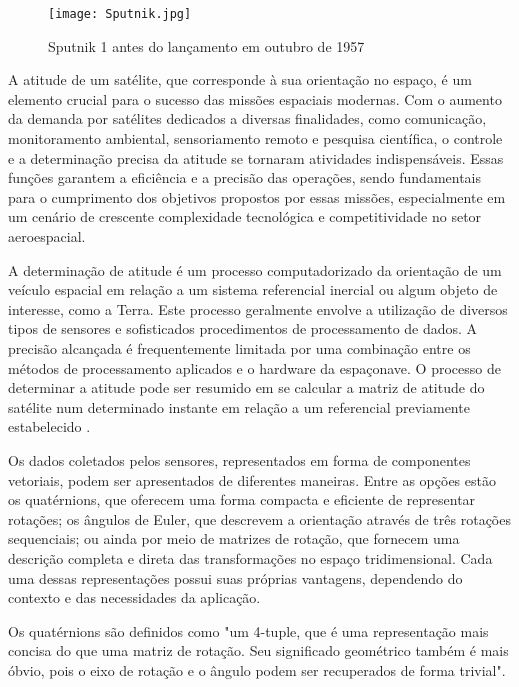 \documentclass[
	12pt,				%
	openright,			%
	oneside,			%
	a4paper,			%
	english,			%
	brazil				%
	]{abntex2}
\begin{document}
\begin{figure}[h]
	\centering
	\texttt{[image: Sputnik.jpg]} %
	\caption[Sputnik 1 antes do lançamento em outubro de 1957]{Sputnik 1 antes do lançamento em outubro de 1957}
	\label{fig:sputnik}
\end{figure}

A atitude de um satélite, que corresponde à sua orientação no espaço, é um elemento crucial para o sucesso das missões espaciais modernas. Com o aumento da demanda por satélites dedicados a diversas finalidades, como comunicação, monitoramento ambiental, sensoriamento remoto e pesquisa científica, o controle e a determinação precisa da atitude se tornaram atividades indispensáveis. Essas funções garantem a eficiência e a precisão das operações, sendo fundamentais para o cumprimento dos objetivos propostos por essas missões, especialmente em um cenário de crescente complexidade tecnológica e competitividade no setor aeroespacial.

A determinação de atitude é um processo computadorizado da orientação de um veículo espacial em relação a um sistema referencial inercial ou algum objeto de interesse, como a Terra. Este processo geralmente envolve a utilização de diversos tipos de sensores e sofisticados procedimentos de processamento de dados. A precisão alcançada é frequentemente limitada por uma combinação entre os métodos de processamento aplicados e o hardware da espaçonave. O processo de determinar a atitude pode ser resumido em se calcular a matriz de atitude do satélite num determinado instante em relação a um referencial previamente estabelecido \cite{Wertz2012}.

Os dados coletados pelos sensores, representados em forma de componentes vetoriais, podem ser apresentados de diferentes maneiras. Entre as opções estão os quatérnions, que oferecem uma forma compacta e eficiente de representar rotações; os ângulos de Euler, que descrevem a orientação através de três rotações sequenciais; ou ainda por meio de matrizes de rotação, que fornecem uma descrição completa e direta das transformações no espaço tridimensional. Cada uma dessas representações possui suas próprias vantagens, dependendo do contexto e das necessidades da aplicação.

Os quatérnions são definidos como "um 4-tuple, que é uma representação mais concisa do que uma matriz de rotação. Seu significado geométrico também é mais óbvio, pois o eixo de rotação e o ângulo podem ser recuperados de forma trivial"\cite{stanford2017quaternions}.
\end{document}
